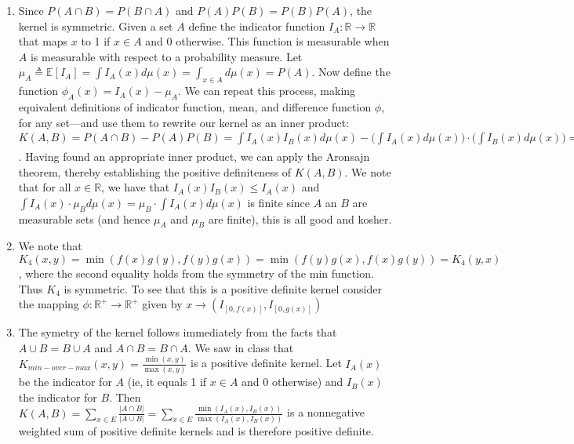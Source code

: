 \documentclass[12pt]{article}
\newenvironment{exercise}[2][Exercise]{\begin{trivlist}
\item[\hskip \labelsep {\bfseries #1}\hskip \labelsep {\bfseries #2.}]}{\end{trivlist}}
\begin{document}
\begin{exercise}{1}
\begin{enumerate}
		\item Since $P(A \cap B) = P(B \cap A)$ and $P(A)P(B) = P(B)P(A)$, the kernel is symmetric. Given a set $A$ define the indicator function $I_A: \mathbb{R} \rightarrow \mathbb{R}$ that maps $x$ to 1 if $x\in A$ and 0 otherwise. This function is measurable when $A$ is measurable with respect to a probability measure. Let $\mu_A \triangleq \mathbb{E}[I_A] = \int I_A (x) d \mu (x) = \int_{x \in A} d \mu (x) = P(A).$ Now define the function $\phi_A(x) = I_A(x) - \mu_A.$ We can repeat this process, making equivalent definitions of indicator function, mean, and difference function $\phi$, for any set---and use them to rewrite our kernel as an inner product: $K(A,B) = P(A\cap B) - P(A)P(B) = \int I_A (x) I_B(x) d \mu(x) - \big(\int I_A(x) d \mu(x) \big) \cdot \big(\int I_B(x) d\mu(x)\big) = \mathbb{E}[I_A I_B] - \mathbb{E}[I_A]\mathbb{E}[I_B] =\mathbb{E}[I_AI_B] - \mu_A\mu_B = \mathbb{E}[I_AI_B] - \mu_A\mathbb{E}[I_B] - \mu_B \mathbb{E}[I_A] -\mu_A\mu_B = \mathbb{E}[(I_A -\mu_A)(I_B - \mu_B)] = \int \phi_A (x) \phi_B (x) d \mu (x) = \langle \phi_A, \phi_B \rangle_{L_2(\mu)}$. Having found an appropriate inner product, we can apply the Aronsajn theorem, thereby establishing the positive definiteness of $K(A,B)$. We note that for all $x\in \mathbb{R}$, we have that $I_A(x)I_B(x) \leq I_A(x)$ and $\int I_A(x) \cdot \mu_B d\mu(x) = \mu_B \cdot \int I_A(x) d\mu(x)$ is finite since $A$ an $B$ are measurable sets (and hence $\mu_A$ and $\mu_B$ are finite), this is all good and kosher.
		\item We note that $K_4(x,y) = \min (f(x)g(y), f(y)g(x)) = \min (f(y)g(x), f(x)g(y)) = K_4(y,x)$, where the second equality holds from the symmetry of the min function. Thus $K_4$ is symmetric. To see that this is a positive definite kernel consider the mapping $\phi: \mathbb{R}^+ \rightarrow \mathbb{R}^+$ given by $x \rightarrow (I_{[0,f(x)]}, I_{[0, g(x)]})$
		\item The symetry of the kernel follows immediately from the facts that $A \cup B = B \cup A$ and $A \cap B = B \cap A$. We saw in class that $K_{min-over-max}(x,y) = \frac{\min(x,y)}{\max(x,y)}$ is a positive definite kernel. Let $I_A(x)$ be the indicator for $A$ (ie, it equals 1 if $x \in A$ and 0 otherwise) and $I_B(x)$ the indicator for $B$. Then $K(A,B) = \sum_{x \in E} \frac{|A \cap B|}{|A \cup B|} = \sum_{x \in E} \frac{\min(I_A(x), I_B(x))}{\max(I_A(x), I_B(x))}$ is a nonnegative weighted sum of positive definite kernels and is therefore positive definite.
			
	\end{enumerate}

\end{exercise}
\end{document}
